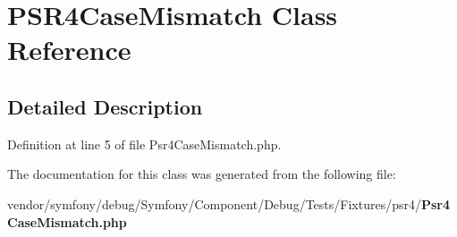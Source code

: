 \section{P\+S\+R4\+Case\+Mismatch Class Reference}
\label{class_symfony_1_1_component_1_1_debug_1_1_tests_1_1_fixtures_1_1_p_s_r4_case_mismatch}


\subsection{Detailed Description}


Definition at line 5 of file Psr4\+Case\+Mismatch.\+php.



The documentation for this class was generated from the following file\+:\begin{DoxyCompactItemize}
\item 
vendor/symfony/debug/\+Symfony/\+Component/\+Debug/\+Tests/\+Fixtures/psr4/{\bf Psr4\+Case\+Mismatch.\+php}\end{DoxyCompactItemize}
